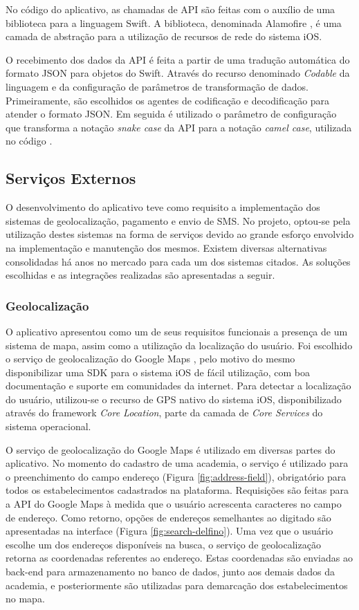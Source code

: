 No código do aplicativo, as chamadas de API são feitas com o auxílio de uma biblioteca para a linguagem Swift. A biblioteca, denominada Alamofire , é uma camada de abstração para a utilização de recursos de rede do sistema iOS.

O recebimento dos dados da API é feita a partir de uma tradução automática do formato JSON para objetos do Swift. Através do recurso denominado \textit{Codable} da linguagem e da configuração de parâmetros de transformação de dados. Primeiramente, são escolhidos os agentes de codificação e decodificação para atender o formato JSON. Em seguida é utilizado o parâmetro de configuração que transforma a notação \textit{snake case} da API para a notação \textit{camel case}, utilizada no código .

\subsection{Serviços Externos}
O desenvolvimento do aplicativo teve como requisito a implementação dos sistemas de geolocalização, pagamento e envio de SMS. No projeto, optou-se pela utilização destes sistemas na forma de serviços devido ao grande esforço envolvido na implementação e manutenção dos mesmos. Existem diversas alternativas consolidadas há anos no mercado para cada um dos sistemas citados. As soluções escolhidas e as integrações realizadas são apresentadas a seguir. 

\subsubsection{Geolocalização}
O aplicativo apresentou como um de seus requisitos funcionais a presença de um sistema de mapa, assim como a utilização da localização do usuário. Foi escolhido o serviço de geolocalização do Google Maps , pelo motivo do mesmo disponibilizar uma SDK para o sistema iOS de fácil utilização, com boa documentação e suporte em comunidades da internet. Para detectar a localização do usuário, utilizou-se o recurso de GPS nativo do sistema iOS, disponibilizado através do framework \textit{Core Location}, parte da camada de \textit{Core Services} do sistema operacional.

O serviço de geolocalização do Google Maps é utilizado em diversas partes do aplicativo. No momento do cadastro de uma academia, o serviço é utilizado para o preenchimento do campo endereço (Figura \ref{fig:address-field}), obrigatório para todos os estabelecimentos cadastrados na plataforma. Requisições são feitas para a API do Google Maps à medida que o usuário acrescenta caracteres no campo de endereço. Como retorno, opções de endereços semelhantes ao digitado são apresentadas na interface (Figura \ref{fig:search-delfino}). Uma vez que o usuário escolhe um dos endereços disponíveis na busca, o serviço de geolocalização retorna as coordenadas referentes ao endereço. Estas coordenadas são enviadas ao back-end para armazenamento no banco de dados, junto aos demais dados da academia, e posteriormente são utilizadas para demarcação dos estabelecimentos no mapa.

